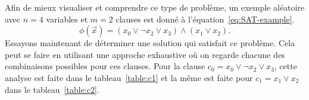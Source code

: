 Afin de mieux visualiser et comprendre ce type de problème, un exemple aléatoire avec $n = 4$ variables et $m = 2$ clauses est donné à l'équation~\ref{eq:SAT-example}.
\begin{equation}\label{eq:SAT-example}
    \phi(\vec{x}) = (x_0 \vee \neg x_2 \vee x_3) \wedge (x_1 \vee x_2).
\end{equation}
Essayons maintenant de déterminer une solution qui satisfait ce problème.
Cela peut se faire en utilisant une approche exhaustive où on regarde chacune des combinaisons possibles pour ces clauses.
Pour la clause $c_0 = x_0 \vee \neg x_2 \vee x_3$, cette analyse est faite dans le tableau~\ref{table:c1} et la même est faite pour $c_1 = x_1 \vee x_2$ dans le tableau~\ref{table:c2}.
